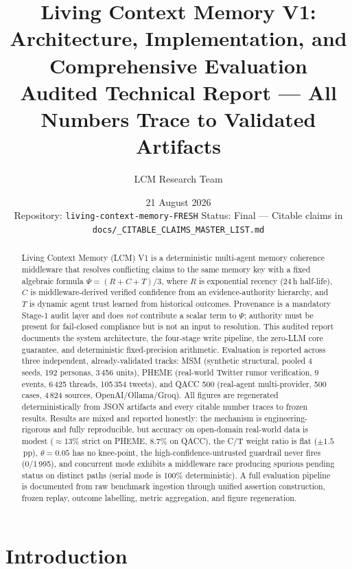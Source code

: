 \documentclass[12pt,a4paper]{article}
\title{Living Context Memory V1: Architecture, Implementation, and Comprehensive Evaluation\\{\large Audited Technical Report --- All Numbers Trace to Validated Artifacts}}
\author{LCM Research Team}
\date{21 August 2026\\\small Repository: \texttt{living-context-memory-FRESH} \quad Status: Final --- Citable claims in \texttt{docs/\_CITABLE\_CLAIMS\_MASTER\_LIST.md}}
\begin{document}
\maketitle

\begin{abstract}
Living Context Memory (LCM) V1 is a deterministic multi-agent memory coherence middleware that resolves conflicting claims to the same memory key with a fixed algebraic formula $\Psi=(R+C+T)/3$, where $R$ is exponential recency (24\,h half-life), $C$ is middleware-derived verified confidence from an evidence-authority hierarchy, and $T$ is dynamic agent trust learned from historical outcomes. Provenance is a mandatory Stage-1 audit layer and does \emph{not} contribute a scalar term to $\Psi$; authority must be present for fail-closed compliance but is not an input to resolution. This audited report documents the system architecture, the four-stage write pipeline, the zero-LLM core guarantee, and deterministic fixed-precision arithmetic. Evaluation is reported across three independent, already-validated tracks: MSM (synthetic structural, pooled 4 seeds, 192 personas, 3\,456 units), PHEME (real-world Twitter rumor verification, 9 events, 6\,425 threads, 105\,354 tweets), and QACC 500 (real-agent multi-provider, 500 cases, 4\,824 sources, OpenAI/Ollama/Groq). All figures are regenerated deterministically from JSON artifacts and every citable number traces to frozen results. Results are mixed and reported honestly: the mechanism is engineering-rigorous and fully reproducible, but accuracy on open-domain real-world data is modest ($\approx$13\% strict on PHEME, 8.7\% on QACC), the C/T weight ratio is flat ($\pm1.5$\,pp), $\theta=0.05$ has no knee-point, the high-confidence-untrusted guardrail never fires (0/1\,995), and concurrent mode exhibits a middleware race producing spurious pending status on distinct paths (serial mode is 100\% deterministic). A full evaluation pipeline is documented from raw benchmark ingestion through unified assertion construction, frozen replay, outcome labelling, metric aggregation, and figure regeneration.
\end{abstract}

\tableofcontents
\newpage

\section{Introduction}
\end{document}
